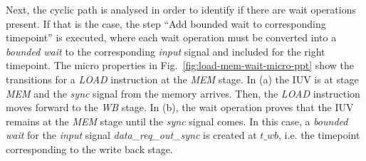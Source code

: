 Next, the cyclic path is analysed in order to identify if there are wait operations present. If that is the case, the step “Add bounded wait to corresponding timepoint” is executed, where each wait operation must be converted into a \textit{bounded wait} to the corresponding \textit{input} signal and included for the right timepoint. The micro properties in Fig.~\ref{fig:load-mem-wait-micro-ppt} show the transitions for a \textit{LOAD} instruction at the \textit{MEM} stage. In (a) the IUV is at stage \textit{MEM} and the \textit{sync} signal from the memory arrives. Then, the \textit{LOAD} instruction moves forward to the \textit{WB} stage. In (b), the wait operation proves that the IUV remains at the \textit{MEM} stage until the \textit{sync} signal comes. In this case, a \textit{bounded wait} for the \textit{input} signal \textit{data\_req\_out\_sync} is created at $t\_wb$, i.e. the timepoint corresponding to the write back stage.

